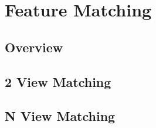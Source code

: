 \chapter{Feature Matching}

\section{Overview}

\section{2 View Matching}

\section{N View Matching}
